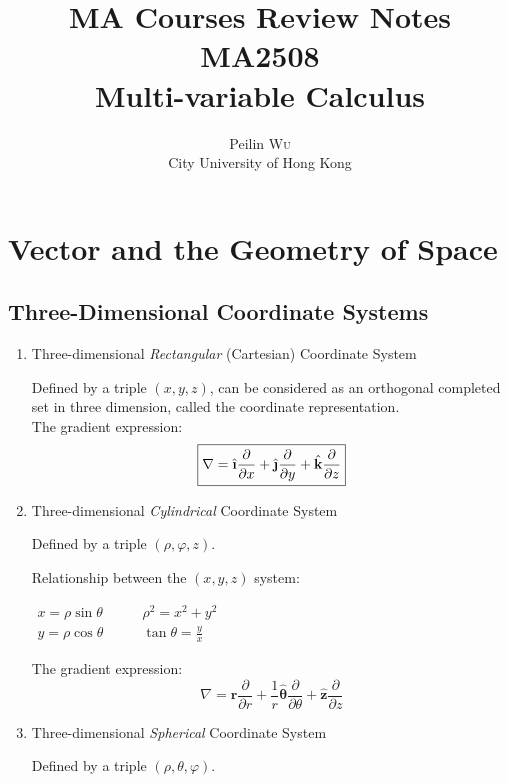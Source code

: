 \documentclass[UTF8,a4paper, 10pt, openany]{svmono}
\title{MA Courses Review Notes\\MA2508\\Multi-variable Calculus}
\author{Peilin \textsc{Wu}\\ City University of Hong Kong
}
\begin{document}
\maketitle
\tableofcontents

\chapter{Vector and the Geometry of Space}
\section{Three-Dimensional Coordinate Systems}
\begin{enumerate}
\item Three-dimensional \emph{Rectangular} (Cartesian) Coordinate System

Defined by a triple $(x, y, z)$, can be considered as an orthogonal completed set in three dimension, called the coordinate representation. \\

The gradient expression:
\begin{equation}
 \boxed{\nabla = \hat{\textbf{\i}}\frac{\partial }{\partial x}+ \hat{\textbf{\j}} \frac{\partial }{\partial y}+\hat{\textbf{k}}\frac{\partial }{\partial z}	}
\end{equation}

\item Three-dimensional \emph{Cylindrical} Coordinate System

Defined by a triple $(\rho, \varphi, z)$.

Relationship between the $(x, y, z)$ system:
\begin{center}
$\begin{array}{ll}
x = \rho \sin \theta \qquad &  \rho ^2 = x^2+y^2\\
y = \rho \cos \theta \qquad &  \tan \theta = \frac{y}{x}
\end{array}$
\end{center}

The gradient expression:
\begin{equation}
 \boxed{\nabla = \bm{\hat{r}}\frac{\partial }{\partial r}+\frac{1}{r} \bm{\hat{\theta}}	\frac{\partial }{\partial \theta}+\bm{\hat{z}}\frac{\partial }{\partial z}}
\end{equation}

\item Three-dimensional \emph{Spherical} Coordinate System

Defined by a triple $(\rho, \theta, \varphi)$.


\end{enumerate}
\end{document}
